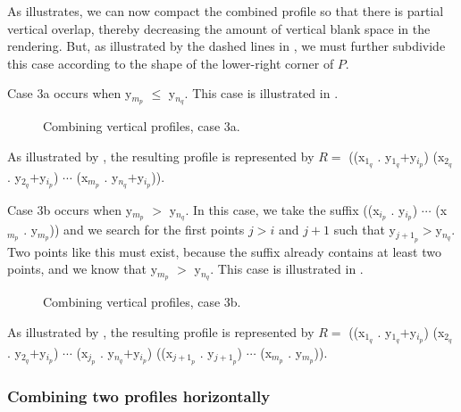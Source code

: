As  illustrates, we can now
compact the combined profile so that there is partial vertical
overlap, thereby decreasing the amount of vertical blank space in the
rendering.  But, as illustrated by the dashed lines in
, we must further subdivide this
case according to the shape of the lower-right corner of $P$.

Case 3a occurs when y$_{m_p}$ $\le$ y$_{n_q}$.  This case is
illustrated in .

\begin{figure}
\begin{center}
\end{center}
\caption{\label{fig-profile-vertical-case-3a}
Combining vertical profiles, case 3a.}
\end{figure}

As illustrated by , the resulting
profile is represented by $R = $ ((x$_{1_q}$ . y$_{1_q}$$+$y$_{i_p}$)
(x$_{2_q}$ . y$_{2_q}$$+$y$_{i_p}$) $\cdots$ (x$_{m_p}$
. y$_{n_q}$$+$y$_{i_p}$)).

Case 3b occurs when y$_{m_p}$ $>$ y$_{n_q}$.  In this case, we take
the suffix ((x$_{i_p}$ . y$_{i_p}$) $\cdots$ (x$_{m_p}$ . y$_{m_p}$))
and we search for the first points $j>i$ and $j+1$ such that
y$_{{j+1}_p}$$>$y$_{n_q}$.  Two points like this must exist, because
the suffix already contains at least two points, and we know that
y$_{m_p}$ $>$ y$_{n_q}$.  This case is illustrated in
.

\begin{figure}
\begin{center}
\end{center}
\caption{\label{fig-profile-vertical-case-3b}
Combining vertical profiles, case 3b.}
\end{figure}

As illustrated by , the resulting
profile is represented by $R = $ ((x$_{1_q}$ . y$_{1_q}$$+$y$_{i_p}$)
(x$_{2_q}$ . y$_{2_q}$$+$y$_{i_p}$) $\cdots$ (x$_{j_p}$
. y$_{n_q}$$+$y$_{i_p}$) ((x$_{{j+1}_p}$ . y$_{{j+1}_p}$) $\cdots$
(x$_{m_p}$ . y$_{m_p}$)).

\subsubsection{Combining two profiles horizontally}

